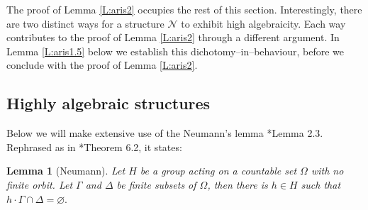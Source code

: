 \documentclass[11pt]{amsart}
\theoremstyle{plain}
\newtheorem{lemma}[theorem]{Lemma}
\theoremstyle{definition}
\begin{document}
The proof of  Lemma \ref{L:aris2} occupies the rest of this section. Interestingly, there are two distinct ways for a structure $\mathcal{N}$ to exhibit high algebraicity. Each  way contributes to the proof of  Lemma \ref{L:aris2} through a  different argument. In Lemma \ref{L:aris1.5} below we establish this dichotomy--in--behaviour, before  we conclude with the proof of Lemma \ref{L:aris2}.




\subsection{Highly algebraic structures}






Below we will make extensive use of the Neumann's lemma \cite{neumann1976structure}*{Lemma 2.3}. Rephrased  as in \cite{Cam}*{Theorem 6.2}, it  states:

\begin{lemma}[Neumann] \label{Thm:Neu} Let $H$ be a group acting on a countable set $\Omega$ with no finite orbit. Let $\Gamma$ and $\Delta$ be finite subsets of $\Omega$, then there is $h\in H$ such that $h\cdot \Gamma \cap \Delta = \varnothing.$
\end{lemma}
\end{document}
